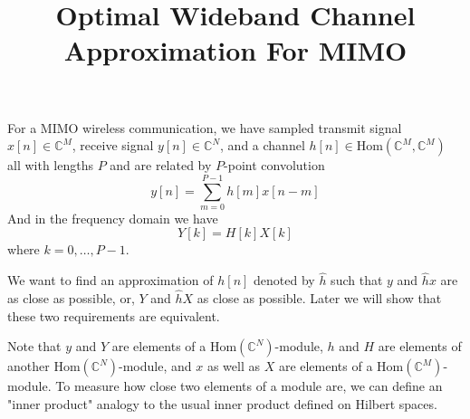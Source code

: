 \documentclass[12pt]{article}
\title{Optimal Wideband Channel Approximation For MIMO}
\theoremstyle{definition}
\begin{document}
\maketitle
For a MIMO wireless communication, we have sampled transmit signal $x[n]\in\mathbb{C}^M$, receive signal $y[n]\in\mathbb{C}^N$, and a channel $h[n]\in\mbox{Hom}\left(\mathbb{C}^M, \mathbb{C}^M\right)$ all with lengths $P$ and are related by $P$-point convolution
$$y[n]=\sum_{m=0}^{P-1}h[m]x[n-m]$$
And in the frequency domain we have
$$Y[k]=H[k]X[k]$$
where $k=0,\dots,P-1$.

We want to find an approximation of $h[n]$ denoted by $\hat{h}$ such that $y$ and $\hat{h}x$ are as close as possible, or, $Y$ and $\hat{h}X$ as close as possible. Later we will show that these two requirements are equivalent.

Note that $y$ and $Y$ are elements of a $\mbox{Hom}\left(\mathbb{C}^N \right)$-module, $h$ and $H$ are elements of another $\mbox{Hom}\left(\mathbb{C}^N \right)$-module, and $x$ as well as $X$ are elements of a $\mbox{Hom}\left(\mathbb{C}^M \right)$-module. To measure how close two elements of a module are, we can define an "inner product" analogy to the usual inner product defined on Hilbert spaces.
\end{document}

